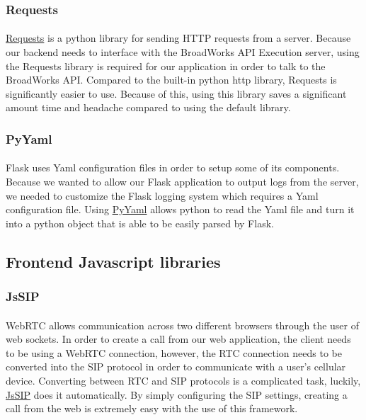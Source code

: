 \documentclass[12pt]{article}
\begin{document}
\subsubsection{Requests}	
\paragraph{}
	\href{http://docs.python-requests.org/en/master/}{Requests} is a python library for sending HTTP requests from a server. Because our backend needs to interface with the BroadWorks API Execution server, using the Requests library is required for our application in order to talk to the BroadWorks API. Compared to the built-in python http library, Requests is significantly easier to use. Because of this, using this library saves a significant amount time and headache compared to using the default library.
	
\subsubsection{PyYaml}	
\paragraph{}
	Flask uses Yaml configuration files in order to setup some of its components. Because we wanted to allow our Flask application to output logs from the server, we needed to customize the Flask logging system which requires a Yaml configuration file. Using \href{https://pyyaml.org/wiki/PyYAMLDocumentation}{PyYaml} allows python to read the Yaml file and turn it into a python object that is able to be easily parsed by Flask.

\subsection{Frontend Javascript libraries}
\subsubsection{JsSIP}	
\paragraph{}
	WebRTC allows communication across two different browsers through the user of web sockets. In order to create a call from our web application, the client needs to be using a WebRTC connection, however, the RTC connection needs to be converted into the SIP protocol in order to communicate with a user's cellular device. Converting between RTC and SIP protocols is a complicated task, luckily, \href{https://jssip.net/}{JsSIP} does it automatically. By simply configuring the SIP settings, creating a call from the web is extremely easy with the use of this framework.
	
\end{document}
